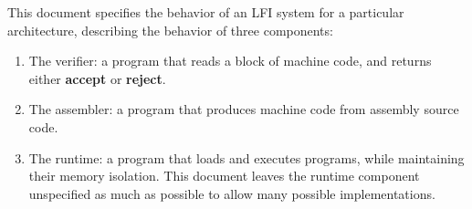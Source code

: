 
\specitem
This document specifies the behavior of an LFI system for a particular
architecture, describing the behavior of three components:

\begin{enumerate}
    \item The verifier: a program that reads a block of machine code, and
        returns either \textbf{accept} or \textbf{reject}.
    \item The assembler: a program that produces machine code from assembly
        source code.
    \item The runtime: a program that loads and executes programs, while
        maintaining their memory isolation. This document leaves the runtime
        component unspecified as much as possible to allow many possible
        implementations.
\end{enumerate}
